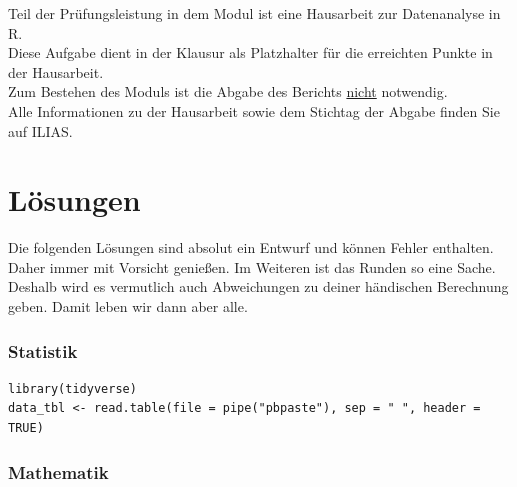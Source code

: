 \documentclass[a4paper, 9pt]{scrartcl}\usepackage[]{graphicx}\usepackage[]{xcolor}
\begin{document}
\begin{graybox}{}
Teil der Prüfungsleistung in dem Modul ist eine Hausarbeit zur Datenanalyse in R.\\

Diese Aufgabe dient in der Klausur als Platzhalter für die erreichten Punkte in der Hausarbeit.\\

Zum Bestehen des Moduls ist die Abgabe des Berichts \underline{nicht} notwendig.\\

Alle Informationen zu der Hausarbeit sowie dem Stichtag der Abgabe finden Sie auf ILIAS.
\end{graybox}
 
\clearpage
\part{Lösungen}

Die folgenden Lösungen sind absolut ein Entwurf und können Fehler enthalten. Daher immer mit Vorsicht genießen. Im Weiteren ist das Runden so eine Sache. Deshalb wird es vermutlich auch Abweichungen zu deiner händischen Berechnung geben. Damit leben wir dann aber alle.

\section*{Statistik}

\begin{verbatim}
library(tidyverse)
data_tbl <- read.table(file = pipe("pbpaste"), sep = " ", header = TRUE)
\end{verbatim}

\section*{Mathematik}
\end{document}
